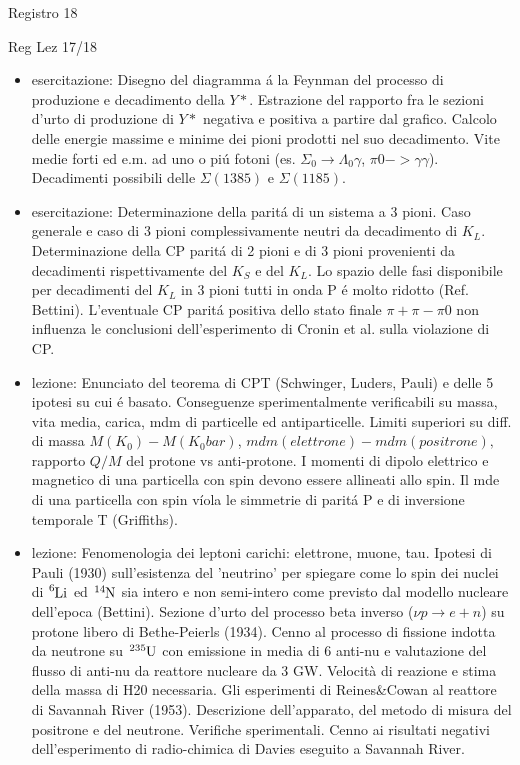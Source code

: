 \begin{frame}{Registro 18}
\begin{frame}[allowframebreaks]{Reg Lez 17/18}
\begin{itemize}
\item esercitazione: Disegno del diagramma \'a la Feynman del processo di produzione e decadimento della $Y*$. Estrazione del rapporto fra le sezioni d'urto di produzione di $Y*$ negativa e positiva a partire dal grafico. Calcolo delle energie massime e minime dei pioni prodotti nel suo decadimento. Vite medie forti ed e.m. ad uno o pi\'u fotoni (es. $\Sigma_0\to\Lambda_0 \gamma$, $\pi0->\gamma \gamma$). Decadimenti possibili delle $\Sigma(1385)$ e $\Sigma(1185)$.

\item esercitazione: Determinazione della parit\'a di un sistema a 3 pioni. Caso generale e caso di 3 pioni complessivamente neutri da decadimento di $K_L$. Determinazione della CP parit\'a di 2 pioni e di 3 pioni provenienti da decadimenti rispettivamente del $K_S$ e del $K_L$. Lo spazio delle fasi disponibile per decadimenti del $K_L$ in 3 pioni tutti in onda P \'e molto ridotto (Ref. Bettini). L'eventuale CP parit\'a positiva dello stato finale $\pi+\pi-\pi0$ non influenza le conclusioni dell'esperimento di Cronin et al. sulla violazione di CP.

\item  lezione: Enunciato del teorema di CPT (Schwinger, L\:uders, Pauli) e delle 5 ipotesi su cui \'e basato. Conseguenze sperimentalmente verificabili su massa, vita media, carica, mdm di particelle ed antiparticelle. Limiti superiori su diff. di massa $M(K_0)-M(K_0bar)$, $mdm(elettrone)-mdm(positrone),$ rapporto $Q/M$ del protone vs anti-protone. I momenti di dipolo elettrico e magnetico di una particella con spin devono essere allineati allo spin. Il mde di una particella con spin v\'iola le simmetrie di parit\'a P e di inversione temporale T (Griffiths).

\item  lezione: Fenomenologia dei leptoni carichi: elettrone, muone, tau. Ipotesi di Pauli (1930) sull'esistenza del 'neutrino' per spiegare come lo spin dei nuclei di $\cel{Li}{6}{}{}$ ed $\cel{N}{14}{}{}$ sia intero e non semi-intero come previsto dal modello nucleare dell'epoca (Bettini). Sezione d'urto del processo beta inverso ($\nu p\to e+n$) su protone libero di Bethe-Peierls (1934). Cenno al processo di fissione indotta da neutrone su $\cel{U}{235}{}{}$ con emissione in media di 6 anti-nu e valutazione del flusso di anti-nu da reattore nucleare da 3 GW. Velocità di reazione e stima della massa di H20 necessaria. Gli esperimenti di Reines\&Cowan al reattore di Savannah River (1953). Descrizione dell'apparato, del metodo di misura del positrone e del neutrone. Verifiche sperimentali. Cenno ai risultati negativi dell'esperimento di radio-chimica di Davies eseguito a Savannah River.


\end{itemize}
\end{frame}
\end{frame}
